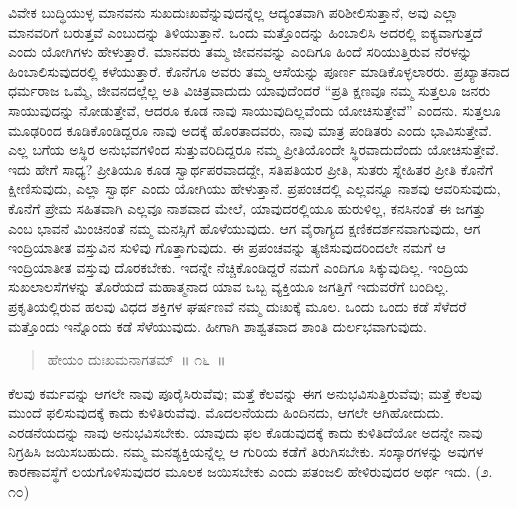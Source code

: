 ವಿವೇಕ ಬುದ್ಧಿಯುಳ್ಳ ಮಾನವನು ಸುಖದುಃಖವೆನ್ನುವುದನ್ನೆಲ್ಲ ಆದ್ಯಂತವಾಗಿ ಪರಿಶೀಲಿಸುತ್ತಾನೆ, ಅವು ಎಲ್ಲಾ ಮಾನವರಿಗೆ ಬರುತ್ತವೆ ಎಂಬುದನ್ನು ತಿಳಿಯುತ್ತಾನೆ. ಒಂದು ಮತ್ತೊಂದನ್ನು ಹಿಂಬಾಲಿಸಿ ಅದರಲ್ಲಿ ಐಕ್ಯವಾಗುತ್ತದೆ ಎಂದು ಯೋಗಿಗಳು ಹೇಳುತ್ತಾರೆ. ಮಾನವರು ತಮ್ಮ ಜೀವನವನ್ನು ಎಂದಿಗೂ ಹಿಂದೆ ಸರಿಯುತ್ತಿರುವ ನೆರಳನ್ನು ಹಿಂಬಾಲಿಸುವುದರಲ್ಲಿ ಕಳೆಯುತ್ತಾರೆ. ಕೊನೆಗೂ ಅವರು ತಮ್ಮ ಆಸೆಯನ್ನು ಪೂರ್ಣ ಮಾಡಿಕೊಳ್ಳಲಾರರು. ಪ್ರಖ್ಯಾತನಾದ ಧರ್ಮರಾಜ ಒಮ್ಮೆ, ಜೀವನದಲ್ಲೆಲ್ಲ ಅತಿ ವಿಚಿತ್ರವಾದುದು ಯಾವುದೆಂದರೆ “ಪ್ರತಿ ಕ್ಷಣವೂ ನಮ್ಮ ಸುತ್ತಲೂ ಜನರು ಸಾಯುವುದನ್ನು ನೋಡುತ್ತೇವೆ, ಆದರೂ ಕೂಡ ನಾವು ಸಾಯುವುದಿಲ್ಲವೆಂದು ಯೋಚಿಸುತ್ತೇವೆ” ಎಂದನು. ಸುತ್ತಲೂ ಮೂಢರಿಂದ ಕೂಡಿಕೊಂಡಿದ್ದರೂ ನಾವು ಅದಕ್ಕೆ ಹೊರತಾದವರು, ನಾವು ಮಾತ್ರ ಪಂಡಿತರು ಎಂದು ಭಾವಿಸುತ್ತೇವೆ. ಎಲ್ಲ ಬಗೆಯ ಅಸ್ಥಿರ ಅನುಭವಗಳಿಂದ ಸುತ್ತುವರಿದಿದ್ದರೂ ನಮ್ಮ ಪ್ರೀತಿಯೊಂದೇ ಸ್ಥಿರವಾದುದೆಂದು ಯೋಚಿಸುತ್ತೇವೆ. ಇದು ಹೇಗೆ ಸಾಧ್ಯ? ಪ್ರೀತಿಯೂ ಕೂಡ ಸ್ವಾರ್ಥಪರವಾದದ್ದೇ, ಸತಿಪತಿಯರ ಪ್ರೀತಿ, ಸುತರು ಸ್ನೇಹಿತರ ಪ್ರೀತಿ ಕೊನೆಗೆ ಕ್ಷೀಣಿಸುವುದು, ಎಲ್ಲಾ ಸ್ವಾರ್ಥ ಎಂದು ಯೋಗಿಯು ಹೇಳುತ್ತಾನೆ. ಪ್ರಪಂಚದಲ್ಲಿ ಎಲ್ಲವನ್ನೂ ನಾಶವು ಆವರಿಸುವುದು, ಕೊನೆಗೆ ಪ್ರೇಮ ಸಹಿತವಾಗಿ ಎಲ್ಲವೂ ನಾಶವಾದ ಮೇಲೆ, ಯಾವುದರಲ್ಲಿಯೂ ಹುರುಳಿಲ್ಲ, ಕನಸಿನಂತೆ ಈ ಜಗತ್ತು ಎಂಬ ಭಾವನೆ ಮಿಂಚಿನಂತೆ ನಮ್ಮ ಮನಸ್ಸಿಗೆ ಹೊಳೆಯುವುದು. ಆಗ ವೈರಾಗ್ಯದ ಕ್ಷಣಿಕದರ್ಶನವಾಗುವುದು, ಆಗ ಇಂದ್ರಿಯಾತೀತ ವಸ್ತುವಿನ ಸುಳಿವು ಗೊತ್ತಾಗುವುದು. ಈ ಪ್ರಪಂಚವನ್ನು ತ್ಯಜಿಸುವುದರಿಂದಲೇ ನಮಗೆ ಆ ಇಂದ್ರಿಯಾತೀತ ವಸ್ತುವು ದೊರಕಬೇಕು. ಇದನ್ನೇ ನೆಚ್ಚಿಕೊಂಡಿದ್ದರೆ ನಮಗೆ ಎಂದಿಗೂ ಸಿಕ್ಕುವುದಿಲ್ಲ. ಇಂದ್ರಿಯ ಸುಖಲಾಲಸೆಗಳನ್ನು ತೊರೆಯದೆ ಮಹಾತ್ಮನಾದ ಯಾವ ಒಬ್ಬ ವ್ಯಕ್ತಿಯೂ ಜಗತ್ತಿಗೆ ಇದುವರೆಗೆ ಬಂದಿಲ್ಲ. ಪ್ರಕೃತಿಯಲ್ಲಿರುವ ಹಲವು ವಿಧದ ಶಕ್ತಿಗಳ ಘರ್ಷಣವೆ ನಮ್ಮ ದುಃಖಕ್ಕೆ ಮೂಲ. ಒಂದು ಒಂದು ಕಡೆ ಸೆಳೆದರೆ ಮತ್ತೊಂದು ಇನ್ನೊಂದು ಕಡೆ ಸೆಳೆಯುವುದು. ಹೀಗಾಗಿ ಶಾಶ್ವತವಾದ ಶಾಂತಿ ದುರ್ಲಭ\break ವಾಗುವುದು. 

\vspace{-0.2cm}

\begin{verse}
ಹೇಯಂ ದುಃಖಮನಾಗತಮ್​~॥ ೧೬~॥
\end{verse}

\vspace{-0.45cm}


\vspace{0.2cm}

ಕೆಲವು ಕರ್ಮವನ್ನು ಆಗಲೇ ನಾವು ಪೂರೈಸಿರುವೆವು; ಮತ್ತೆ ಕೆಲವನ್ನು ಈಗ ಅನುಭವಿಸುತ್ತಿರುವೆವು; ಮತ್ತೆ ಕೆಲವು ಮುಂದೆ ಫಲಿಸುವುದಕ್ಕೆ ಕಾದು ಕುಳಿತಿರುವೆವು. ಮೊದಲನೆಯದು ಹಿಂದಿನದು, ಆಗಲೇ ಆಗಿಹೋದುದು. ಎರಡನೆಯದನ್ನು ನಾವು ಅನುಭವಿಸಬೇಕು. ಯಾವುದು ಫಲ ಕೊಡುವುದಕ್ಕೆ ಕಾದು ಕುಳಿತಿದೆಯೋ ಅದನ್ನೇ ನಾವು ನಿಗ್ರಹಿಸಿ ಜಯಿಸಬಹುದು. ನಮ್ಮ ಮನಶ್ಯಕ್ತಿಯನ್ನೆಲ್ಲ ಆ ಗುರಿಯ ಕಡೆಗೆ ತಿರುಗಿಸಬೇಕು. ಸಂಸ್ಕಾರಗಳನ್ನು ಅವುಗಳ ಕಾರಣಾವಸ್ಥೆಗೆ ಲಯಗೊಳಿಸುವುದರ ಮೂಲಕ ಜಯಿಸಬೇಕು ಎಂದು ಪತಂಜಲಿ ಹೇಳಿರುವುದರ ಅರ್ಥ ಇದು. (೨. ೧೦)

\newpage


